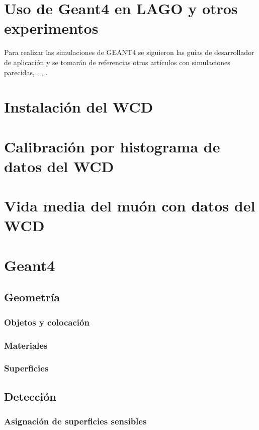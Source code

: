 \documentclass{book}
\begin{document}
\section{Uso de Geant4 en LAGO y otros experimentos}

Para realizar las simulaciones de GEANT4 se siguieron las gu\'ias de desarrollador de aplicaci\'on y se tomar\'an de referencias otros art\'iculos con simulaciones parecidas, \citep{NIELSEN}, \citep{CHEN}, \citep{CALDERON}.



\section{Instalaci\'on del WCD}

\section{Calibraci\'on por histograma de datos del WCD}

\section{Vida media del mu\'on con datos del WCD}

\section{Geant4}
\subsection{Geometr\'ia}
\subsubsection{Objetos y colocaci\'on}
\subsubsection{Materiales}
\subsubsection{Superficies}

\subsection{Detecci\'on}
\subsubsection{Asignaci\'on de superficies sensibles}
\end{document}
